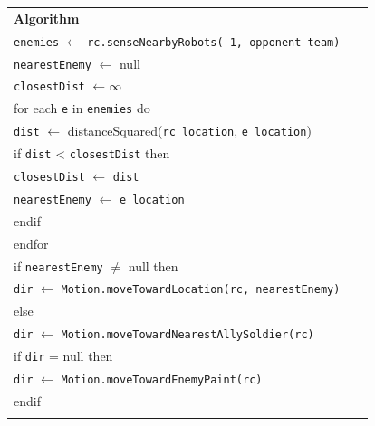 \documentclass{article}
\newenvironment{pseudobox}
{
\centering
\begin{longtable}{|p{0.94\linewidth}|}
\hline
}
{
\\ \hline
\end{longtable}
\vspace{0.05cm}
}
\begin{document}
\begin{enumerate}[label=\alph*.]
\begin{pseudobox}
\textbf{Algorithm} \\

\hspace*{1.5em}\texttt{enemies} $\leftarrow$ \texttt{rc.senseNearbyRobots(-1, opponent team)} \\

\hspace*{1.5em}\texttt{nearestEnemy} $\leftarrow$ null \\
\hspace*{1.5em}\texttt{closestDist} $\leftarrow \infty$ \\

\hspace*{1.5em}for each \texttt{e} in \texttt{enemies} do \\

\hspace*{3em}\texttt{dist} $\leftarrow$ distanceSquared(\texttt{rc location}, \texttt{e location}) \\

\hspace*{3em}if \texttt{dist} < \texttt{closestDist} then \\
\hspace*{4.5em}\texttt{closestDist} $\leftarrow$ \texttt{dist} \\
\hspace*{4.5em}\texttt{nearestEnemy} $\leftarrow$ \texttt{e location} \\
\hspace*{3em}endif \\

\hspace*{1.5em}endfor \\

\hspace*{1.5em}if \texttt{nearestEnemy} $\neq$ null then \\
\hspace*{3em}\texttt{dir} $\leftarrow$ \texttt{Motion.moveTowardLocation(rc, nearestEnemy)} \\

\hspace*{1.5em}else \\

\hspace*{3em}\texttt{dir} $\leftarrow$ \texttt{Motion.moveTowardNearestAllySoldier(rc)} \\

\hspace*{3em}if \texttt{dir} = null then \\
\hspace*{4.5em}\texttt{dir} $\leftarrow$ \texttt{Motion.moveTowardEnemyPaint(rc)} \\
\hspace*{3em}endif \\


\end{pseudobox}
\end{enumerate}
\end{document}

